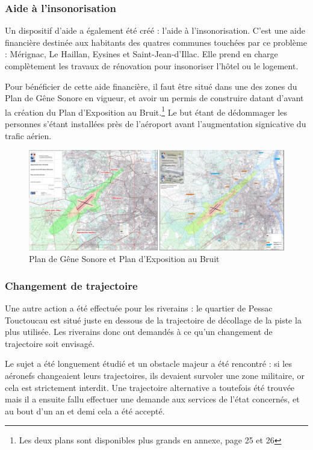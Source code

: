 \subsubsection{Aide à l'insonorisation}

Un dispositif d'aide a également été créé : l'aide à l'insonorisation.
C'est une aide financière destinée aux habitants des quatres communes touchées par ce problème : Mérignac, Le Haillan, Eysines et Saint-Jean-d'Illac. Elle prend en charge complètement les travaux de rénovation pour insonoriser l'hôtel ou le logement.

Pour bénéficier de cette aide financière, il faut être situé dans une des zones du Plan de Gêne Sonore en vigueur, et avoir un permis de construire datant d'avant la création du Plan d'Exposition au Bruit.\footnote{Les deux plans sont disponibles plus grands en annexe, page 25 et 26}
Le but étant de dédommager les personnes s'étant installées près de l'aéroport avant l'augmentation signicative du trafic aérien.

\begin{figure}[hbt!]
  \centering
  \includegraphics[width=16cm]{Images/pgs_peb.png}\newline
  \caption{Plan de Gêne Sonore et Plan d'Exposition au Bruit}
  \label{fig:pgs_peb}
\end{figure}

\subsubsection{Changement de trajectoire}

Une autre action a été effectuée pour les riverains : le quartier de Pessac Touctoucau est situé juste en dessous de la trajectoire de décollage de la piste la plus utilisée. Les riverains donc ont demandés à ce qu'un changement de trajectoire soit envisagé.

Le sujet a été longuement étudié et un obstacle majeur a été rencontré : si les aéronefs changeaient leurs trajectoires, ils devaient survoler une zone militaire, or cela est strictement interdit.
Une trajectoire alternative a toutefois été trouvée mais il a ensuite fallu effectuer une demande aux services de l'état concernés, et au bout d'un an et demi cela a été accepté.\newline

